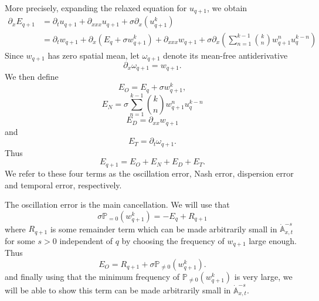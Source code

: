 \documentclass[12pt,reqno,letterpaper]{amsart}
\numberwithin{equation}{section}
\newcommand{\1}{{\bf 1}}
\newcommand{\2}{{\bf 2}}
\theoremstyle{remark}
\theoremstyle{remark}
\begin{document}
More precisely, expanding the relaxed equation for $u_{q+1}$, we obtain 
\begin{equation*}
    \begin{split}
        \partial_x E_{q+1} &= \partial_t u_{q+1} + \partial_{xxx} u_{q+1} + \sigma \partial_x \left(u_{q+1}^k\right)\\
        &= \partial_t w_{q+1} + \partial_x \left(E_q + \sigma w_{q+1}^k\right) + \partial_{xxx} w_{q+1} + \sigma \partial_x\left(\sum_{n=1}^{k-1} \binom{k}{n} w_{q+1}^n u_q^{k-n} \right)
    \end{split}
\end{equation*}
Since $w_{q+1}$ has zero spatial mean, let $\omega_{q+1}$ denote its mean-free antiderivative
\[
\partial_x\omega_{q+1}=w_{q+1}.
\]
We then define
\begin{equation}\label{eq:osc_error}
    E_O = E_q + \sigma w_{q+1}^k,
\end{equation}
\begin{equation}\label{eq:Nash_error}
    E_N = \sigma \sum_{n=1}^{k-1} \binom{k}{n} w_{q+1}^n u_q^{k-n}
\end{equation}
\begin{equation}\label{eq:dis_error}
    E_D = \partial_{xx} w_{q+1}
\end{equation}
and
\begin{equation}\label{eq:temporal_error}
    E_T = \partial_t \omega_{q+1}.
\end{equation}
Thus
\begin{equation}\label{eq:Rq+1}
    E_{q+1} = E_O + E_N + E_D + E_T.
\end{equation}
We refer to these four terms as the oscillation error, Nash error, dispersion error and temporal error, respectively. 

The oscillation error is the main cancellation. We will use that
$$
\sigma\mathbb{P}_{=0}(w_{q+1}^k) = -E_q + R_{q+1}
$$
where $R_{q+1}$ is some remainder term which can be made arbitrarily small in $\dot{\mathbb{A}}^{-s}_{x,t}$ for some $s > 0$ independent of $q$ by choosing the frequency of $w_{q+1}$ large enough. Thus
$$
E_O = R_{q+1} + \sigma\mathbb{P}_{\not=0}(w_{q+1}^k).
$$
and finally using that the minimum frequency of $\mathbb{P}_{\not=0}(w_{q+1}^k)$ is very large, we will be able to show this term can be made arbitrarily small in $\dot{\mathbb{A}}^{-s}_{x,t}$.

\end{document}
